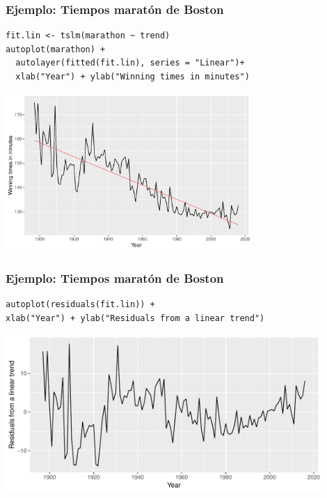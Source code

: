 \documentclass[10pt]{beamer}
\begin{document}



\begin{frame}[fragile]
\frametitle{Ejemplo: Tiempos maratón de Boston}

\lstset{language=r,label= ,caption= ,captionpos=b,numbers=none}
\begin{lstlisting}
fit.lin <- tslm(marathon ~ trend)
autoplot(marathon) +
  autolayer(fitted(fit.lin), series = "Linear")+
  xlab("Year") + ylab("Winning times in minutes")
\end{lstlisting}

\pause

\begin{center}
\includegraphics[width=0.7\textwidth]{5-regression_files/figure-beamer/marathonLinear-1.pdf}
\end{center} 



\end{frame}






\begin{frame}[fragile]
\frametitle{Ejemplo: Tiempos maratón de Boston}

\lstset{language=r,label= ,caption= ,captionpos=b,numbers=none}
\begin{lstlisting}
autoplot(residuals(fit.lin)) +
xlab("Year") + ylab("Residuals from a linear trend")
\end{lstlisting}

\pause
\begin{center}
\includegraphics[width=0.9\textwidth]{5-regression_files/figure-beamer/unnamed-chunk-11-1.pdf}
\end{center} 



\end{frame}
\end{document}
